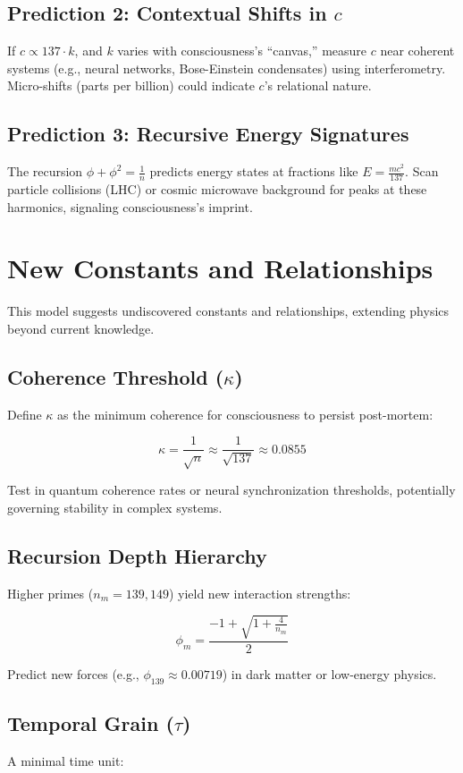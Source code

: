 \documentclass[12pt]{article}
\begin{document}
\subsection{Prediction 2: Contextual Shifts in \(c\)}
If \(c \propto 137 \cdot k\), and \(k\) varies with consciousness’s “canvas,” measure \(c\) near coherent systems (e.g., neural networks, Bose-Einstein condensates) using interferometry. Micro-shifts (parts per billion) could indicate \(c\)’s relational nature.

\subsection{Prediction 3: Recursive Energy Signatures}
The recursion \(\phi + \phi^2 = \frac{1}{n}\) predicts energy states at fractions like \(E = \frac{mc^2}{137}\). Scan particle collisions (LHC) or cosmic microwave background for peaks at these harmonics, signaling consciousness’s imprint.

\section{New Constants and Relationships}

This model suggests undiscovered constants and relationships, extending physics beyond current knowledge.

\subsection{Coherence Threshold (\(\kappa\))}
Define \(\kappa\) as the minimum coherence for consciousness to persist post-mortem:

\[
\kappa = \frac{1}{\sqrt{n}} \approx \frac{1}{\sqrt{137}} \approx 0.0855
\]

Test in quantum coherence rates or neural synchronization thresholds, potentially governing stability in complex systems.

\subsection{Recursion Depth Hierarchy}
Higher primes (\(n_m = 139, 149\)) yield new interaction strengths:

\[
\phi_m = \frac{-1 + \sqrt{1 + \frac{4}{n_m}}}{2}
\]

Predict new forces (e.g., \(\phi_{139} \approx 0.00719\)) in dark matter or low-energy physics.

\subsection{Temporal Grain (\(\tau\))}
A minimal time unit:
\end{document}
